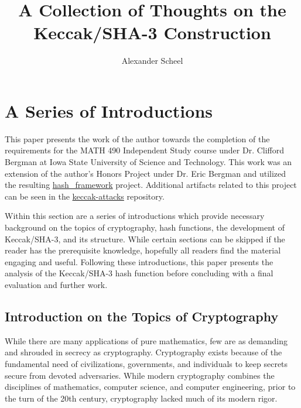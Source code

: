 \documentclass[10pt,twocolumn,twoside]{pnas-new}
\title{A Collection of Thoughts on the Keccak/SHA-3 Construction}
\author{Alexander Scheel}
\affil{Iowa State University}
\begin{document}
\verticaladjustment{-2pt}

\maketitle

% 

\section{A Series of Introductions} \label{sec:intro}
    This paper presents the work of the author towards the completion of the
requirements for the MATH 490 Independent Study course under Dr. Clifford
Bergman at Iowa State University of Science and Technology. This work was an
extension of the author's Honors Project under Dr. Eric Bergman and utilized
the resulting
\href{https://github.com/cipherboy/hash\_framework}{hash\_framework} project.
Additional artifacts related to this project can be seen in the
\href{https://github.com/cipherboy/keccak-attacks}{keccak-attacks} repository.

    Within this section are a series of introductions which provide necessary
background on the topics of cryptography, hash functions, the development of
Keccak/SHA-3, and its structure. While certain sections can be skipped if the
reader has the prerequisite knowledge, hopefully all readers find the material
engaging and useful. Following these introductions, this paper presents the
analysis of the Keccak/SHA-3 hash function before concluding with a final
evaluation and further work.



\subsection{Introduction on the Topics of Cryptography} \label{sec:i:crypto}

    While there are many applications of pure mathematics, few are as
demanding and shrouded in secrecy as cryptography. Cryptography exists
because of the fundamental need of civilizations, governments, and individuals
to keep secrets secure from devoted adversaries. While modern cryptography
combines the disciplines of mathematics, computer science, and computer
engineering, prior to the turn of the 20th century, cryptography lacked much
of its modern rigor.
\end{document}
